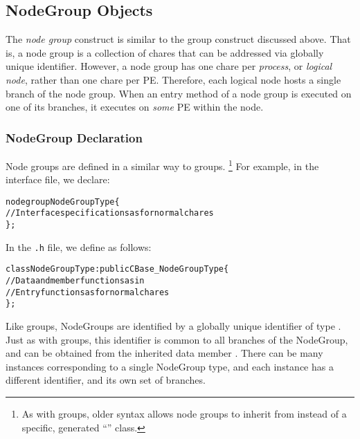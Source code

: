 \subsection{NodeGroup Objects}

The {\em node group} construct    is 
similar to the group construct discussed above. 
That is, a node group is a collection of chares that can be addressed via globally unique
identifier. 
However, a node group has one chare per {\em process}, or {\em logical node}, rather than one chare per PE.
Therefore, each logical node hosts a single branch of the
node group.  When an entry method of a
node group is executed on one of its branches, it executes on {\em some} PE within the node.

\subsubsection{NodeGroup Declaration} 

Node groups are defined in a similar way to groups.  \footnote{As with groups,
older syntax allows node groups to inherit from  instead of a
specific, generated ``'' class.} For example, in the interface file, we declare:

\begin{alltt}
 nodegroup NodeGroupType \{
  // Interface specifications as for normal chares
 \};
\end{alltt}

In the {\tt .h} file, we define  as follows:

\begin{alltt}
 class NodeGroupType : public CBase_NodeGroupType \{
  // Data and member functions as in \CC{}
  // Entry functions as for normal chares
 \};
\end{alltt}

Like groups, NodeGroups are identified by a globally unique identifier of type
.  Just as with groups, this identifier is
common to all branches of the NodeGroup, and can be obtained from the inherited
data member .
There can be many instances corresponding to a single NodeGroup
type, and each instance has a different identifier, and its own set of
branches.




